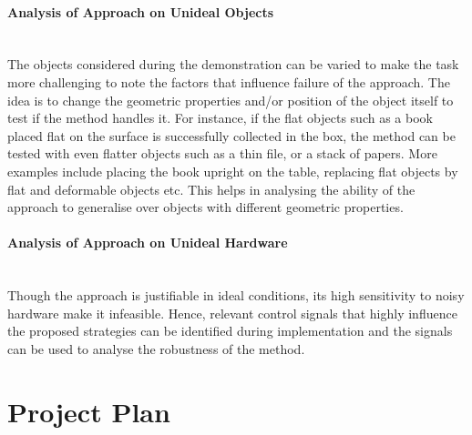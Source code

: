 \documentclass[rnd]{mas_proposal}
\begin{document}
\paragraph{Analysis of Approach on Unideal Objects}~\\
The objects considered during the demonstration can be varied to make the task more challenging to note the factors that influence failure of the approach. The idea is to change the geometric properties and/or position of the object itself to test if the method handles it. For instance, if the flat objects such as a book placed flat on the surface is successfully collected in the box, the method can be tested with even flatter objects such as a thin file, or a stack of papers. More examples include placing the book upright on the table, replacing flat objects by flat and deformable objects etc. This helps in analysing the ability of the approach to generalise over objects with different geometric properties. 

\paragraph{Analysis of Approach on Unideal Hardware}~\\
Though the approach is justifiable in ideal conditions, its high sensitivity to noisy hardware make it infeasible. Hence, relevant control signals that highly influence the proposed strategies can be identified during implementation and the signals can be used to analyse the robustness of the method. 


 \newpage
\section{Project Plan}
\end{document}
